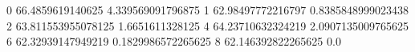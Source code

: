 0 66.4859619140625 4.339569091796875
1 62.98497772216797 0.8385848999023438
2 63.811553955078125 1.6651611328125
4 64.23710632324219 2.0907135009765625
6 62.32939147949219 0.1829986572265625
8 62.146392822265625 0.0
